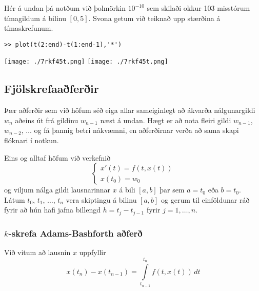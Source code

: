 \documentclass[icelandic,a4paper,12pt]{article}
\begin{document}
Hér á undan þá notðum við þolmörkin $10^{-10}$ sem skilaði okkur 103 misstórum tímagildum
á bilinu $[0,5]$.
Svona getum við teiknað upp stærðina á tímaskrefunum.
\begin{verbatim}
>> plot(t(2:end)-t(1:end-1),'*')
\end{verbatim}
{\texttt{[image: ./7rkf45t.png]}}
{\texttt{[image: ./7rkf45t.png]}}




% 
% 
% 
% 


\subsection{Fjölskrefaaðferðir} 
Þær aðferðir sem við höfum séð eiga allar sameiginlegt að ákvarða
nálgunargildi $w_{n}$ aðeins út frá gildinu $w_{n-1}$ næst á undan. Hægt
er að nota fleiri gildi $w_{n-1}$, $w_{n-2}$, $\ldots$ og fá þannig betri
nákvæmni, en aðferðirnar verða að sama skapi flóknari í notkun. 

\pause
\smallskip
Eins og alltaf höfum við verkefnið 
\begin{equation*}
  \left\{
    \begin{array}{l}
      x'(t) = f(t,x(t)) \\
      x(t_0) = w_0
    \end{array}
  \right.
\end{equation*}
og viljum nálga gildi lausnarinnar $x$ á bili $[a,b]$ þar sem $a =
t_0$ eða $b = t_0$. Látum $t_0$, $t_1$, $\ldots$, $t_n$ vera skiptingu
á bilinu $[a,b]$ og gerum til einföldunar ráð fyrir að hún hafi jafna
billengd $h=t_{j} - t_{j-1}$ fyrir $j= 1, \ldots, n$. 



\subsubsection{$k$-skrefa  Adams-Bashforth aðferð} 
Við vitum að lausnin $x$ uppfyllir
\begin{equation*}
  x(t_{n}) - x(t_{n-1}) = 
  \int\limits_{t_{n-1}}^{t_n} f(t,x(t)) \, dt 
\end{equation*}
\end{document}
